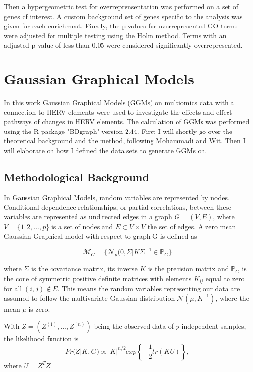 \documentclass[a4paper,12pt,twoside,openright]{report}
\begin{document}
Then a hypergeometric test\cite{GOstats} for overreprensentation was performed on a set of genes of interest. A custom background set of genes specific to the analysis was given for each enrichment. Finally, the p-values for overrepresented GO terms were adjusted for multiple testing using the Holm method\cite{10.2307/4615733}. Terms with an adjusted p-value of less than 0.05 were considered significantly overrepresented. 

\section{Gaussian Graphical Models}
\label{Methods:Gaussian Graphical Models}
In this work Gaussian Graphical Models (GGMs) on multiomics data with a connection to HERV elements were used to investigate the effects and effect pathways of changes in HERV elements. The calculation of GGMs was performed using the R package "BDgraph" version 2.44\cite{Mohammadi2015BDgraphAR}. First I will shortly go over the theoretical background and the method, following Mohammadi and Wit\cite{Mohammadi2015,Mohammadi2015BDgraphAR}. Then I will elaborate on how I defined the data sets to generate GGMs on.

\subsection{Methodological Background}
In Gaussian Graphical Models, random variables are represented by nodes. Conditional dependence relationships, or partial correlations,  between these variables are represented as undirected edges in a graph $G=(V,E)$, where $V=\{1,2, ..., p\}$ is a set of nodes and $E \subset V \times V$ the set of edges. A zero mean Gaussian Graphical model with respect to graph G is defined as

\begin{equation}
\mathcal{M}_G = \lbrace \mathcal{N}_p(0,\Sigma|K  \Sigma^{-1} \in \mathbb{P}_G \rbrace
\end{equation}

where $\Sigma$ is the covariance matrix, its inverse $K$ is the precision matrix and $\mathbb{P}_G$ is the cone of symmetric positive definite matrices with elements $K_{ij}$ equal to zero for all $(i,j)\notin E$. This means the random variables representing our data are assumed to follow the multivariate Gaussian distribution $\mathcal{N}(\mu, K^{-1})$, where the mean $\mu$ is zero.

With $Z = (Z^{(1)}, ..., Z^{(n)})$ being the observed data of $p$ independent samples, the likelihood function is
\begin{equation}
Pr(Z|K,G) \propto |K|^{n/2} exp\left\lbrace-\frac{1}{2}tr(KU)\right\rbrace,
\end{equation}
where $U = Z^TZ$.
\end{document}
